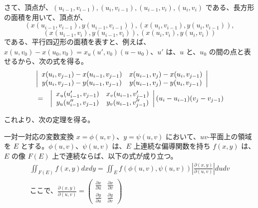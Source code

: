 \medskip
さて、頂点が、$(u_{i-1},v_{i-1}),(u_{i},v_{i-1}),(u_{i-1},v_i),(u_i,v_i)$ である、長方形の面積を用いて、頂点が、
$$(x(u_{i-1},v_{i-1}),y(u_{i-1},v_{i-1})), (x(u_{i},v_{i-1}), y(u_{i},v_{i-1})),$$
$$(x(u_{i-1},v_i),y(u_{i-1},v_i)),(x(u_i,v_i),y(u_i,v_i))$$ 
である、平行四辺形の面積を表すと、例えば、$x(u,v_0)-x(u_0,v_0) = x_u(u',v_0)(u-u_0)$、$u'$ は、$u$ と、$u_0$ の間の点と表せるから、次の式を得る。
\begin{eqnarray}
\lefteqn{\left|\begin{array}{cc}
x(u_i,v_{j-1})-x(u_{i-1},v_{j-1}) & x(u_{i-1},v_{j})-x(u_{i},v_{j-1})\\
y(u_i,v_{j-1})-y(u_{i-1},v_{j-1}) & y(u_{i-1},v_{j})-y(u_{i},v_{j-1})
\end{array}\right|} \\
&=&
\left|\begin{array}{cc}
x_u(u_{i-1}',v_{j-1}) & x_v(u_{i-1},v_{j-1}')\\
y_u(u_{i-1}'',v_{j-1}) & y_v(u_{i-1},v_{j-1}'')
\end{array}\right|(u_i-u_{i-1})(v_j-v_{j-1})
\end{eqnarray}

これより、次の定理を得る。
\begin{thm} \label{thm:int:change}
一対一対応の変数変換 $x = \phi(u,v)$、$y= \psi(u,v)$ において、$uv$-平面上の領域を $E$ とする。$\phi(u,v)$、$\psi(u,v)$ は、$E$ 上連続な偏導関数を持ち $f(x,y)$ は、$E$ の像 $F(E)$ 上で連続ならば、以下の式が成り立つ。
\begin{eqnarray}
\iint_{F(E)}f(x,y)dxdy = \iint_Ef(\phi(u,v),\psi(u,v))\left|\frac{\partial(x,y)}{\partial(u,v)}\right|dudv\\
\mbox{ここで、}\frac{\partial(x,y)}{\partial(u,v)} = 
\left(\begin{array}{cc}\frac{\partial x}{\partial u} & \frac{\partial x}{\partial v}
\\ \frac{\partial y}{\partial u} & \frac{\partial y}{\partial v}\end{array}\right)
\end{eqnarray}
\end{thm}

